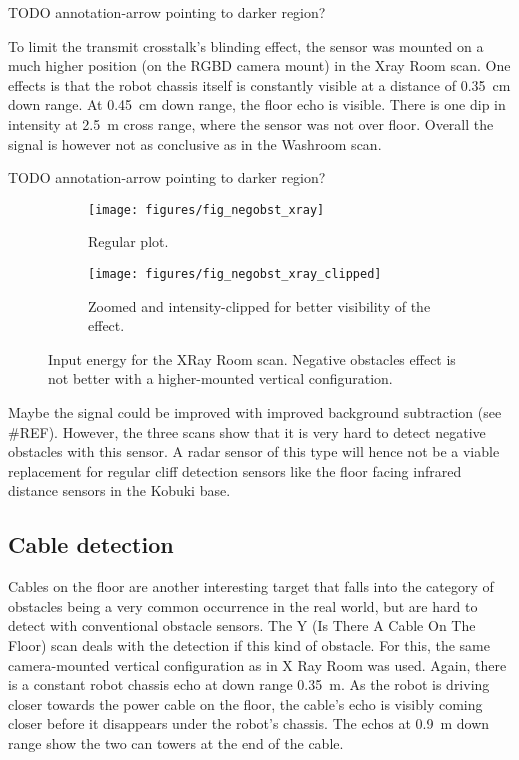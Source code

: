TODO annotation-arrow pointing to darker region?

To limit the transmit crosstalk's blinding effect, the sensor was
mounted on a much higher position (on the RGBD camera mount) in the Xray
Room scan. One effects is that the robot chassis itself is constantly
visible at a distance of \SI{0.35}{cm} down range. At \SI{0.45}{cm} down range, the
floor echo is visible. There is one dip in intensity at \SI{2.5}{m} cross
range, where the sensor was not over floor. Overall the signal is
however not as conclusive as in the Washroom scan.

TODO annotation-arrow pointing to darker region?

\begin{figure}[htbp]
    \centering
    \begin{subfigure}[t]{.475\textwidth}
        \texttt{[image: figures/fig\_negobst\_xray]}
        \caption{Regular plot.}
        \label{fig:negobst_xray}
    \end{subfigure}%
    \hfill%
    \begin{subfigure}[t]{.475\textwidth}
        \texttt{[image: figures/fig\_negobst\_xray\_clipped]}
        \caption{Zoomed and intensity-clipped for better visibility of the effect.}
        \label{fig:negobst_xray_clipped}
    \end{subfigure}
    \caption{Input energy for the XRay Room scan. Negative obstacles effect is not better with a higher-mounted vertical configuration.}
\end{figure}


Maybe the signal could be improved with improved background subtraction
(see \#REF). However, the three scans show that it is very hard to
detect negative obstacles with this sensor. A radar sensor of this type
will hence not be a viable replacement for regular cliff detection
sensors like the floor facing infrared distance sensors in the Kobuki
base.

\subsection{Cable detection}\label{cable-detection}

Cables on the floor are another interesting target that falls into the
category of obstacles being a very common occurrence in the real world,
but are hard to detect with conventional obstacle sensors. The Y (Is
There A Cable On The Floor) scan deals with the detection if this kind
of obstacle. For this, the same camera-mounted vertical configuration as
in X Ray Room was used. Again, there is a constant robot chassis echo at
down range \SI{0.35}{m}. As the robot is driving closer towards the power cable
on the floor, the cable's echo is visibly coming closer before it
disappears under the robot's chassis. The echos at \SI{0.9}{m} down range show
the two can towers at the end of the cable.


